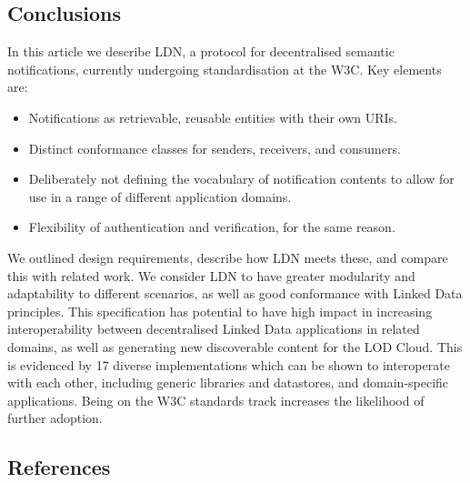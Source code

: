 \documentclass[]{article}
\providecommand{\tightlist}{%
  \setlength{\itemsep}{0pt}\setlength{\parskip}{0pt}}
\begin{document}
\hypertarget{conclusions}{}
\subsection{Conclusions}\label{conclusions}

In this article we describe LDN, a protocol for decentralised semantic
notifications, currently undergoing standardisation at the W3C. Key
elements are:

\begin{itemize}
\tightlist
\item
  Notifications as retrievable, reusable entities with their own URIs.
\item
  Distinct conformance classes for senders, receivers, and consumers.
\item
  Deliberately not defining the vocabulary of notification contents to
  allow for use in a range of different application domains.
\item
  Flexibility of authentication and verification, for the same reason.
\end{itemize}

We outlined design requirements, describe how LDN meets these, and
compare this with related work. We consider LDN to have greater
modularity and adaptability to different scenarios, as well as good
conformance with Linked Data principles. This specification has
potential to have high impact in increasing interoperability between
decentralised Linked Data applications in related domains, as well as
generating new discoverable content for the LOD Cloud. This is evidenced
by 17 diverse implementations which can be shown to interoperate with
each other, including generic libraries and datastores, and
domain-specific applications. Being on the W3C standards track increases
the likelihood of further adoption.

\hypertarget{references}{}
\subsection{References}\label{references}
\end{document}
